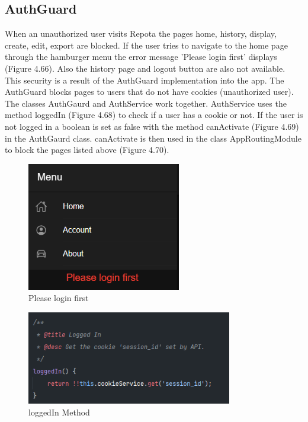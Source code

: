 \subsection{AuthGuard}
When an unauthorized user visits Repota the pages home, history, display, create, edit, export are blocked. If the user tries to navigate to the home page through the hamburger menu the error message 'Please login first' displays (Figure 4.66). Also the history page and logout button are also not available. This security is a result of the AuthGuard implementation into the app. The AuthGuard blocks pages to users that do not have cookies (unauthorized user). The classes AuthGaurd and AuthService work together. AuthService uses the method loggedIn (Figure 4.68) to check if a user has a cookie or not. If the user is not logged in a boolean is set as false with the method canActivate (Figure 4.69) in the AuthGaurd class. canActivate is then used in the class AppRoutingModule to block the pages listed above (Figure 4.70).

\begin{figure}[H]
    \centering
    \caption{Please login first}
    \label{image:pleaseLogin}
    \includegraphics[width=0.6\textwidth]{images/repota/UI/please_login.png}
\end{figure}

\begin{figure}[H]
    \centering
    \caption{loggedIn Method}
    \label{image:loggedIn}
    \includegraphics[width=0.8\textwidth]{images/repota/auth_guard/loggedIn.png}
\end{figure}

